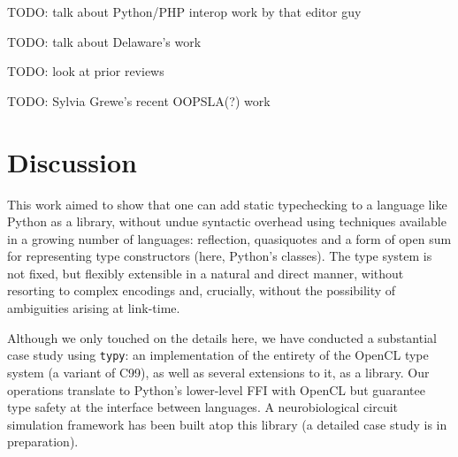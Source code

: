 \documentclass[preprint,10pt]{sigplanconf}
\begin{document}
TODO: talk about Python/PHP interop work by that editor guy

TODO: talk about Delaware's work

TODO: look at prior reviews

TODO: Sylvia Grewe's recent OOPSLA(?) work

\section{Discussion}\label{discussion}
This work aimed to show that one can add static typechecking to a language like Python as a library, without undue syntactic overhead using techniques available in a growing number of languages: reflection, quasiquotes and a form of open sum for representing type constructors (here, Python's classes). The type system is not fixed, but flexibly extensible in a natural and direct manner, without resorting to complex encodings and, crucially, without the possibility of ambiguities arising at link-time. 

Although we only touched on the details here, we have conducted a substantial case study using \texttt{typy}: an implementation of the entirety of the OpenCL type system (a variant of C99), as well as several extensions to it, as a library. Our operations translate to Python's lower-level FFI with OpenCL but guarantee type safety at the interface between languages. A neurobiological circuit simulation framework has been built atop this library (a detailed case study is in preparation). %
\end{document}
